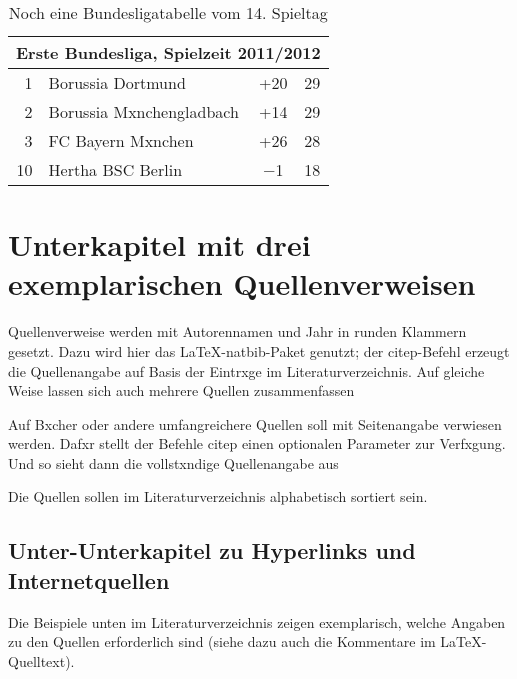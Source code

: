             \begin{table}[htp] 
                \centering
                \begin{tabular}{rlcc}  %
                    \toprule
                    \multicolumn{4}{c}{\large\sffamily Erste Bundesliga, Spielzeit 2011/2012}\\ \midrule
                        1 & Borussia Dortmund & +20 & 29\\ 
                        2 & Borussia Mxnchengladbach & +14 & 29\\
                        3 & FC Bayern Mxnchen & +26 & 28\\
                        10 & Hertha BSC Berlin & $-$1 & 18 \\ \bottomrule
                \end{tabular}
                \caption{Noch eine Bundesligatabelle vom 14. Spieltag}\label{t_buli2}
            \end{table}

        \section{Unterkapitel mit drei exemplarischen Quellenverweisen}

            Quellenverweise werden mit Autorennamen und Jahr in runden Klammern gesetzt. Dazu wird hier das \LaTeX-natbib-Paket genutzt; der citep-Befehl erzeugt die Quellenangabe auf Basis der Eintrxge im Literaturverzeichnis. Auf gleiche Weise lassen sich auch mehrere Quellen zusammenfassen

            Auf Bxcher oder andere umfangreichere Quellen soll mit Seitenangabe verwiesen werden. Dafxr stellt der Befehle citep  einen optionalen Parameter zur Verfxgung. Und so sieht dann die vollstxndige Quellenangabe aus

            Die Quellen sollen im Literaturverzeichnis alphabetisch sortiert sein.


            \subsection{Unter-Unterkapitel zu Hyperlinks und Internetquellen}

                Die Beispiele unten im Literaturverzeichnis zeigen exemplarisch, welche Angaben zu den Quellen erforderlich sind (siehe dazu auch die Kommentare im \LaTeX-Quelltext). 


